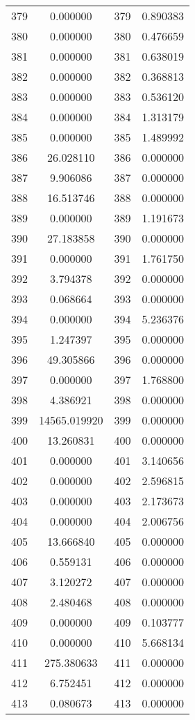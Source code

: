\documentclass[12pt]{article}
\begin{document}
\begin{longtable}{@{}cccc@{}}
379 & 0.000000 & 379 & 0.890383 \\
380 & 0.000000 & 380 & 0.476659 \\
381 & 0.000000 & 381 & 0.638019 \\
382 & 0.000000 & 382 & 0.368813 \\
383 & 0.000000 & 383 & 0.536120 \\
384 & 0.000000 & 384 & 1.313179 \\
385 & 0.000000 & 385 & 1.489992 \\
386 & 26.028110 & 386 & 0.000000 \\
387 & 9.906086 & 387 & 0.000000 \\
388 & 16.513746 & 388 & 0.000000 \\
389 & 0.000000 & 389 & 1.191673 \\
390 & 27.183858 & 390 & 0.000000 \\
391 & 0.000000 & 391 & 1.761750 \\
392 & 3.794378 & 392 & 0.000000 \\
393 & 0.068664 & 393 & 0.000000 \\
394 & 0.000000 & 394 & 5.236376 \\
395 & 1.247397 & 395 & 0.000000 \\
396 & 49.305866 & 396 & 0.000000 \\
397 & 0.000000 & 397 & 1.768800 \\
398 & 4.386921 & 398 & 0.000000 \\
399 & 14565.019920 & 399 & 0.000000 \\
400 & 13.260831 & 400 & 0.000000 \\
401 & 0.000000 & 401 & 3.140656 \\
402 & 0.000000 & 402 & 2.596815 \\
403 & 0.000000 & 403 & 2.173673 \\
404 & 0.000000 & 404 & 2.006756 \\
405 & 13.666840 & 405 & 0.000000 \\
406 & 0.559131 & 406 & 0.000000 \\
407 & 3.120272 & 407 & 0.000000 \\
408 & 2.480468 & 408 & 0.000000 \\
409 & 0.000000 & 409 & 0.103777 \\
410 & 0.000000 & 410 & 5.668134 \\
411 & 275.380633 & 411 & 0.000000 \\
412 & 6.752451 & 412 & 0.000000 \\
413 & 0.080673 & 413 & 0.000000 \\

\end{longtable}
\end{document}
